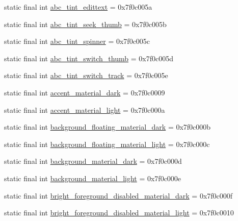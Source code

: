 \begin{CompactItemize}
\item 
static final int \hyperlink{classandroid_1_1support_1_1v7_1_1palette_1_1_r_1_1color_1a5180f823cef37c91011881d03fac28}{abc\_\-tint\_\-edittext} = 0x7f0c005a
\item 
static final int \hyperlink{classandroid_1_1support_1_1v7_1_1palette_1_1_r_1_1color_6e96806527e9f979c5192df41474e06d}{abc\_\-tint\_\-seek\_\-thumb} = 0x7f0c005b
\item 
static final int \hyperlink{classandroid_1_1support_1_1v7_1_1palette_1_1_r_1_1color_51decf225d7fa138a468fdfceabbaf17}{abc\_\-tint\_\-spinner} = 0x7f0c005c
\item 
static final int \hyperlink{classandroid_1_1support_1_1v7_1_1palette_1_1_r_1_1color_b8a61e18c19b03bb6356cb4b7e4765ac}{abc\_\-tint\_\-switch\_\-thumb} = 0x7f0c005d
\item 
static final int \hyperlink{classandroid_1_1support_1_1v7_1_1palette_1_1_r_1_1color_a9e4f60fbe7087ce9094801c01b82996}{abc\_\-tint\_\-switch\_\-track} = 0x7f0c005e
\item 
static final int \hyperlink{classandroid_1_1support_1_1v7_1_1palette_1_1_r_1_1color_ee6deb333fff70ffd7fe8cdafde882c1}{accent\_\-material\_\-dark} = 0x7f0c0009
\item 
static final int \hyperlink{classandroid_1_1support_1_1v7_1_1palette_1_1_r_1_1color_08fd41afeb87a54f48891292ceb704e1}{accent\_\-material\_\-light} = 0x7f0c000a
\item 
static final int \hyperlink{classandroid_1_1support_1_1v7_1_1palette_1_1_r_1_1color_2aaa8cc8e111819d608978b3a6ef7170}{background\_\-floating\_\-material\_\-dark} = 0x7f0c000b
\item 
static final int \hyperlink{classandroid_1_1support_1_1v7_1_1palette_1_1_r_1_1color_df511e1d21c62cab044e130e9bfd1e59}{background\_\-floating\_\-material\_\-light} = 0x7f0c000c
\item 
static final int \hyperlink{classandroid_1_1support_1_1v7_1_1palette_1_1_r_1_1color_3828ef5f7ec2c95afee7da355b100c44}{background\_\-material\_\-dark} = 0x7f0c000d
\item 
static final int \hyperlink{classandroid_1_1support_1_1v7_1_1palette_1_1_r_1_1color_af1e04524deb0d8d3f13432bc6ed5cb6}{background\_\-material\_\-light} = 0x7f0c000e
\item 
static final int \hyperlink{classandroid_1_1support_1_1v7_1_1palette_1_1_r_1_1color_477c5d798ac667439e387f07b2170830}{bright\_\-foreground\_\-disabled\_\-material\_\-dark} = 0x7f0c000f
\item 
static final int \hyperlink{classandroid_1_1support_1_1v7_1_1palette_1_1_r_1_1color_c2ff8dd37d8d1361ec0ce15568ffdb86}{bright\_\-foreground\_\-disabled\_\-material\_\-light} = 0x7f0c0010

\end{CompactItemize}
